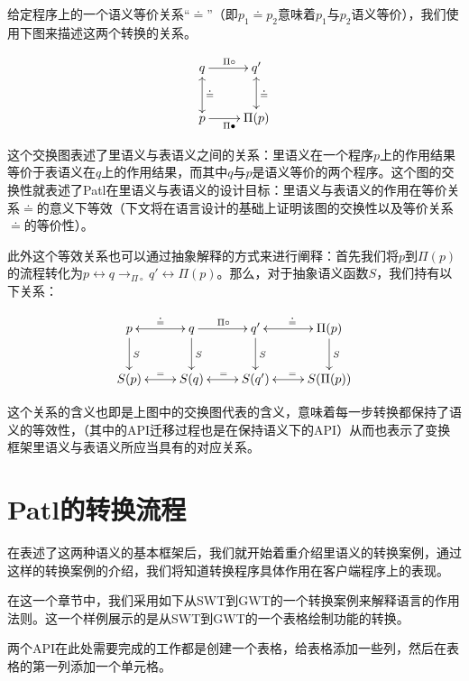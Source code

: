 给定程序上的一个语义等价关系“$\doteq$”（即$p_1\doteq p_2$意味着$p_1$与$p_2$语义等价），我们使用下图来描述这两个转换的关系。

\begin{equation}\label{eqn:diagram}
  \xymatrix{
    q \ar[r]^{\Pi\circ}  & q' \ar@{<->}[d]^{
    \doteq} \\
     p \ar[r]_{\Pi\bullet} \ar@{<->}[u]_\doteq       & \Pi(p) }
\end{equation}

这个交换图表述了里语义与表语义之间的关系：里语义在一个程序$p$上的作用结果等价于表语义在$q$上的作用结果，而其中$q$与$p$是语义等价的两个程序。这个图的交换性就表述了Patl在里语义与表语义的设计目标：里语义与表语义的作用在等价关系$\doteq$的意义下等效（下文将在语言设计的基础上证明该图的交换性以及等价关系$\doteq$的等价性）。

此外这个等效关系也可以通过抽象解释的方式来进行阐释：首先我们将$p$到$\Pi(p)$的流程转化为$p\leftrightarrow q \rightarrow_{\Pi\circ}q'\leftrightarrow \Pi(p)$。那么，对于抽象语义函数$S$，我们持有以下关系：

\begin{displaymath}
  \xymatrix{
    p \ar@{<->}[r]^\doteq \ar[d]^S & q \ar[r]^{\Pi\circ}  \ar[d]^S & q' \ar@{<->}[r]^{
      \doteq} \ar[d]^S & \Pi(p) \ar[d]^S\\
    S(p) \ar@{<->}[r]^= & S(q) \ar@{<->}[r]^= & S(q') \ar@{<->}[r]^= & S(\Pi(p))}
\end{displaymath}

这个关系的含义也即是上图中的交换图代表的含义，意味着每一步转换都保持了语义的等效性，（其中的API迁移过程也是在保持语义下的API）从而也表示了变换框架里语义与表语义所应当具有的对应关系。

\section{Patl的转换流程}
在表述了这两种语义的基本框架后，我们就开始着重介绍里语义的转换案例，通过这样的转换案例的介绍，我们将知道转换程序具体作用在客户端程序上的表现。

在这一个章节中，我们采用如下从SWT到GWT的一个转换案例来解释语言的作用法则。这一个样例展示的是从SWT到GWT的一个表格绘制功能的转换。

两个API在此处需要完成的工作都是创建一个表格，给表格添加一些列，然后在表格的第一列添加一个单元格。

